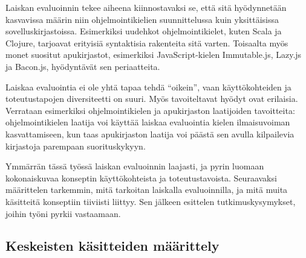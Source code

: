 
Laiskan evaluoinnin tekee aiheena kiinnostavaksi se, että sitä hyödynnetään kasvavissa määrin niin ohjelmointikielien suunnittelussa kuin yksittäisissa sovelluskirjastoissa. Esimerkiksi uudehkot ohjelmointikielet, kuten Scala ja Clojure, tarjoavat erityisiä syntaktisia rakenteita sitä varten. Toisaalta myös monet suositut apukirjastot, esimerkiksi JavaScript-kielen Immutable.js, Lazy.js ja Bacon.js, hyödyntävät sen periaatteita.

Laiskaa evaluointia ei ole yhtä tapaa tehdä ``oikein'', vaan käyttökohteiden ja toteutustapojen diversiteetti on suuri. Myös tavoiteltavat hyödyt ovat erilaisia. Verrataan esimerkiksi ohjelmointikielen ja apukirjaston laatijoiden tavoitteita: ohjelmointikielen laatija voi käyttää laiskaa evaluointia kielen ilmaisuvoiman kasvattamiseen, kun taas apukirjaston laatija voi päästä sen avulla kilpailevia kirjastoja parempaan suorituskykyyn.

Ymmärrän tässä työssä laiskan evaluoinnin laajasti, ja pyrin luomaan kokonaiskuvaa konseptin käyttökohteista ja toteutustavoista.  Seuraavaksi määrittelen tarkemmin, mitä tarkoitan laiskalla evaluoinnilla, ja mitä muita käsitteitä konseptiin tiiviisti liittyy. Sen jälkeen esittelen tutkimuskysymykset, joihin työni pyrkii vastaamaan.


\subsection{Keskeisten käsitteiden määrittely}

